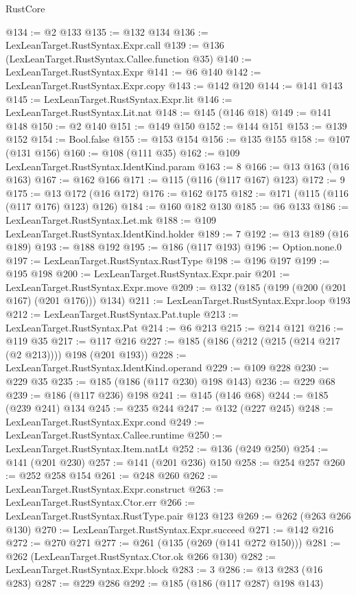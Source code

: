 \begin{lexlean}{RustCore}
\begin{coremodule}
{\begin{coremodule}
{{{{{{@134 := @2 @133
@135 := @132 @134
@136 := LexLeanTarget.RustSyntax.Expr.call
@139 := @136 (LexLeanTarget.RustSyntax.Callee.function @35)
@140 := LexLeanTarget.RustSyntax.Expr
@141 := @6 @140
@142 := LexLeanTarget.RustSyntax.Expr.copy
@143 := @142 @120
@144 := @141 @143
@145 := LexLeanTarget.RustSyntax.Expr.lit
@146 := LexLeanTarget.RustSyntax.Lit.nat
@148 := @145 (@146 @18)
@149 := @141 @148
@150 := @2 @140
@151 := @149 @150
@152 := @144 @151
@153 := @139 @152
@154 := Bool.false
@155 := @153 @154
@156 := @135 @155
@158 := @107 (@131 @156)
@160 := @108 (@111 @35)
@162 := @109 LexLeanTarget.RustSyntax.IdentKind.param
@163 := 8
@166 := @13 @163 (@16 @163)
@167 := @162 @166
@171 := @115 (@116 (@117 @167) @123)
@172 := 9
@175 := @13 @172 (@16 @172)
@176 := @162 @175
@182 := @171 (@115 (@116 (@117 @176) @123) @126)
@184 := @160 @182 @130
@185 := @6 @133
@186 := LexLeanTarget.RustSyntax.Let.mk
@188 := @109 LexLeanTarget.RustSyntax.IdentKind.holder
@189 := 7
@192 := @13 @189 (@16 @189)
@193 := @188 @192
@195 := @186 (@117 @193)
@196 := Option.none.{0}
@197 := LexLeanTarget.RustSyntax.RustType
@198 := @196 @197
@199 := @195 @198
@200 := LexLeanTarget.RustSyntax.Expr.pair
@201 := LexLeanTarget.RustSyntax.Expr.move
@209 := @132 (@185 (@199 (@200 (@201 @167) (@201 @176))) @134)
@211 := LexLeanTarget.RustSyntax.Expr.loop @193
@212 := LexLeanTarget.RustSyntax.Pat.tuple
@213 := LexLeanTarget.RustSyntax.Pat
@214 := @6 @213
@215 := @214 @121
@216 := @119 @35
@217 := @117 @216
@227 := @185 (@186 (@212 (@215 (@214 @217 (@2 @213)))) @198 (@201 @193))
@228 := LexLeanTarget.RustSyntax.IdentKind.operand
@229 := @109 @228
@230 := @229 @35
@235 := @185 (@186 (@117 @230) @198 @143)
@236 := @229 @68
@239 := @186 (@117 @236) @198
@241 := @145 (@146 @68)
@244 := @185 (@239 @241) @134
@245 := @235 @244
@247 := @132 (@227 @245)
@248 := LexLeanTarget.RustSyntax.Expr.cond
@249 := LexLeanTarget.RustSyntax.Callee.runtime
@250 := LexLeanTarget.RustSyntax.Item.natLt
@252 := @136 (@249 @250)
@254 := @141 (@201 @230)
@257 := @141 (@201 @236) @150
@258 := @254 @257
@260 := @252 @258 @154
@261 := @248 @260
@262 := LexLeanTarget.RustSyntax.Expr.construct
@263 := LexLeanTarget.RustSyntax.Ctor.err
@266 := LexLeanTarget.RustSyntax.RustType.pair @123 @123
@269 := @262 (@263 @266 @130)
@270 := LexLeanTarget.RustSyntax.Expr.succeed
@271 := @142 @216
@272 := @270 @271
@277 := @261 (@135 (@269 (@141 @272 @150)))
@281 := @262 (LexLeanTarget.RustSyntax.Ctor.ok @266 @130)
@282 := LexLeanTarget.RustSyntax.Expr.block
@283 := 3
@286 := @13 @283 (@16 @283)
@287 := @229 @286
@292 := @185 (@186 (@117 @287) @198 @143)
}}}}}}
\end{coremodule}}
\end{coremodule}
\end{lexlean}
